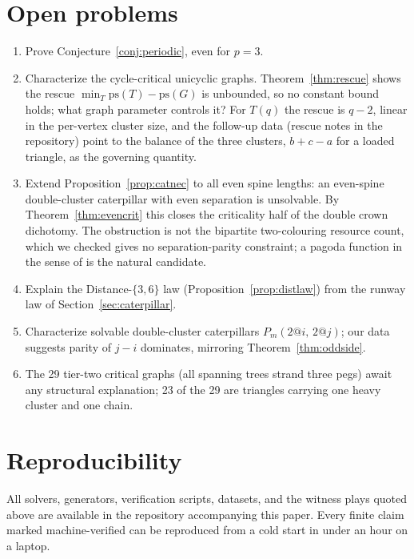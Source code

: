 \documentclass[11pt]{article}
\theoremstyle{definition}
\newcommand{\ps}{\mathrm{ps}}
\begin{document}
\section{Open problems}

\begin{enumerate}
\item Prove Conjecture~\ref{conj:periodic}, even for $p=3$.
\item Characterize the cycle-critical unicyclic graphs. Theorem~\ref{thm:rescue}
shows the rescue $\min_T\ps(T)-\ps(G)$ is unbounded, so no constant
bound holds; what graph parameter controls it? For $T(q)$ the rescue
is $q-2$, linear in the per-vertex cluster size, and the follow-up
data (rescue notes in the repository) point to the balance of the
three clusters, $b+c-a$ for a loaded triangle, as the governing
quantity.
\item Extend Proposition~\ref{prop:catnec} to all even spine lengths:
an even-spine double-cluster caterpillar with even separation is
unsolvable. By Theorem~\ref{thm:evencrit} this closes the criticality
half of the double crown dichotomy. The obstruction is not the
bipartite two-colouring resource count, which we checked gives no
separation-parity constraint; a pagoda function in the sense of
\cite{Kpagoda} is the natural candidate.
\item Explain the Distance-$\{3,6\}$ law
(Proposition~\ref{prop:distlaw}) from the runway law of
Section~\ref{sec:caterpillar}.
\item Characterize solvable double-cluster caterpillars
$P_m(2\!@\!i,\,2\!@\!j)$; our data suggests parity of $j-i$
dominates, mirroring Theorem~\ref{thm:oddside}.
\item The 29 tier-two critical graphs (all spanning trees strand
three pegs) await any structural explanation; 23 of the 29 are
triangles carrying one heavy cluster and one chain.
\end{enumerate}

\section*{Reproducibility}

All solvers, generators, verification scripts, datasets, and the
witness plays quoted above are available in the repository
accompanying this paper. Every finite claim marked machine-verified
can be reproduced from a cold start in under an hour on a laptop.
\end{document}
